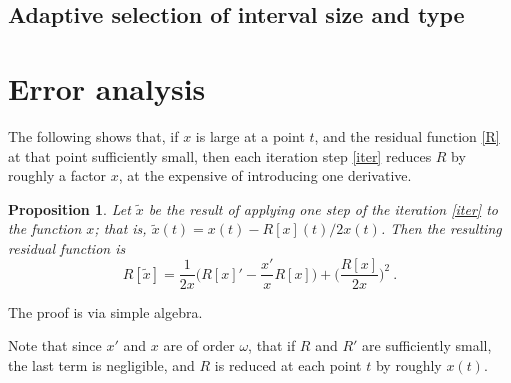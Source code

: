 \documentclass[10pt]{article}
\newcommand{\be}{\begin{equation}}
\newcommand{\ee}{\end{equation}}
\newtheorem{pro}[thm]{Proposition}
\newcommand{\om}{\omega}
\begin{document}
\subsection{Adaptive selection of interval size and type}


\section{Error analysis}

The following shows that, if $x$ is large at a point $t$,
and the residual function \eqref{R} at that point sufficiently small,
then each iteration step \eqref{iter} reduces $R$ by roughly a factor
$x$, at the expensive of introducing one derivative.
\begin{pro}
  Let $\tilde x$ be the result of applying one step of
  the iteration \eqref{iter} to the function $x$;
  that is, $\tilde x(t) = x(t) - R[x](t)/2x(t)$.
  Then the resulting residual function is
  \be
  R[\tilde x] = \frac{1}{2x}\biggl(
  R[x]' - \frac{x'}{x} R[x]
    \biggr) + \biggl(\frac{R[x]}{2x}\biggr)^2~.
  \label{Riter}
  \ee
\end{pro}
The proof is via simple algebra.

Note that since $x'$ and $x$ are of order $\om$,
that if $R$ and $R'$ are sufficiently small,
the last term is negligible, and $R$ is reduced at each point $t$
by roughly $x(t)$.






\end{document}
